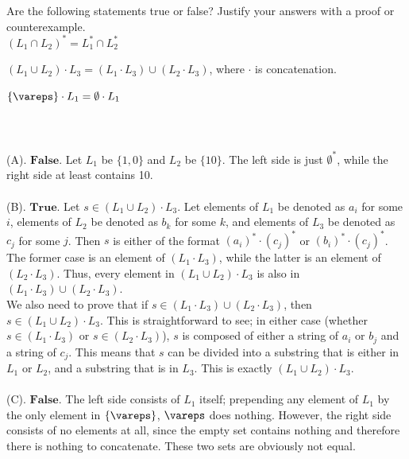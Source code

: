 \documentclass[solution, letterpaper]{cs121}
\begin{document}
Are the following statements true or false? Justify your answers with a proof or counterexample.\\
\subproblem $(L_1 \cap L_2)^* = L_1^* \cap L_2^*$

\subproblem $(L_1 \cup L_2) \cdot L_3 = (L_1 \cdot L_3) \cup (L_2 \cdot L_3)$, where $\cdot$ is concatenation.

\subproblem $\{ \vareps\} \cdot L_1 = \emptyset \cdot L_1$
\\\\
\\\\(A). $\textbf{False}$.  Let $L_1$ be $\{1,0\}$ and $L_2$ be $\{10\}$.  The left side is just $\emptyset^*$, while the right side at least contains 10.
\\\\(B). $\textbf{True}$.  Let $s \in (L_1 \cup L_2) \cdot L_3$.  Let elements of $L_1$ be denoted as $a_i$ for some $i$, elements of $L_2$ be denoted as $b_k$ for some $k$, and elements of $L_3$ be denoted as $c_j$ for some $j$.  Then $s$ is either of the format $(a_i)^* \cdot (c_j)^*$ or $(b_i)^* \cdot (c_j)^*$.  The former case is an element of $(L_1 \cdot L_3)$, while the latter is an element of $(L_2 \cdot L_3)$.  Thus, every element in $(L_1 \cup L_2) \cdot L_3$ is also in $(L_1 \cdot L_3) \cup (L_2 \cdot L_3)$.
\\\indent We also need to prove that if $s \in (L_1 \cdot L_3) \cup (L_2 \cdot L_3)$, then $s \in (L_1 \cup L_2) \cdot L_3$.  This is straightforward to see; in either case (whether $s \in (L_1 \cdot L_3)$ or $s \in (L_2 \cdot L_3)$), $s$ is composed of either a string of $a_i$ or $b_j$ and a string of $c_j$.  This means that $s$ can be divided into a substring that is either in $L_1$ or $L_2$, and a substring that is in $L_3$.  This is exactly $(L_1 \cup L_2) \cdot L_3$.
\\\\(C). $\textbf{False}$.  The left side consists of $L_1$ itself; prepending any element of $L_1$ by the only element in $\{\vareps\}$, $\vareps$ does nothing.  However, the right side consists of no elements at all, since the empty set contains nothing and therefore there is nothing to concatenate.  These two sets are obviously not equal.
\end{document}
